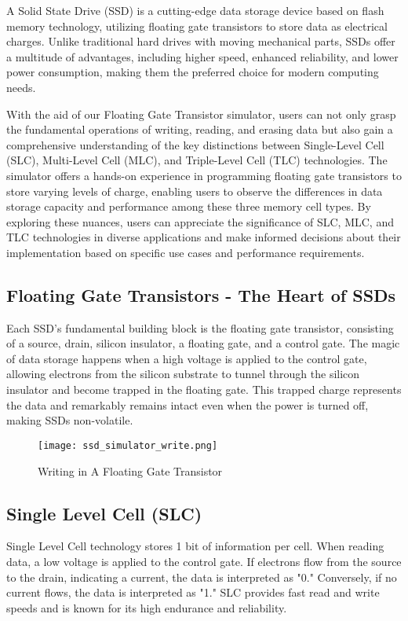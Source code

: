 \documentclass[conference]{/home/habib/Desktop/flash_ssd_simulator_web/paper_writing/latex_file/IEEEtran}
\begin{document}
A Solid State Drive (SSD) is a cutting-edge data storage device based on flash memory technology, utilizing floating gate transistors to store data as electrical charges. Unlike traditional hard drives with moving mechanical parts, SSDs offer a multitude of advantages, including higher speed, enhanced reliability, and lower power consumption, making them the preferred choice for modern computing needs.

With the aid of our Floating Gate Transistor simulator, users can not only grasp the fundamental operations of writing, reading, and erasing data but also gain a comprehensive understanding of the key distinctions between Single-Level Cell (SLC), Multi-Level Cell (MLC), and Triple-Level Cell (TLC) technologies. The simulator offers a hands-on experience in programming floating gate transistors to store varying levels of charge, enabling users to observe the differences in data storage capacity and performance among these three memory cell types. By exploring these nuances, users can appreciate the significance of SLC, MLC, and TLC technologies in diverse applications and make informed decisions about their implementation based on specific use cases and performance requirements.

\subsection{Floating Gate Transistors - The Heart of SSDs}
Each SSD's fundamental building block is the floating gate transistor, consisting of a source, drain, silicon insulator, a floating gate, and a control gate. The magic of data storage happens when a high voltage is applied to the control gate, allowing electrons from the silicon substrate to tunnel through the silicon insulator and become trapped in the floating gate. This trapped charge represents the data and remarkably remains intact even when the power is turned off, making SSDs non-volatile.
\begin{figure}[h]
    \centering
    \texttt{[image: ssd\_simulator\_write.png]}
    \caption{Writing in A Floating Gate Transistor}
    \label{fig:ssd_simulator_write}
\end{figure}
\subsection{Single Level Cell (SLC)}
Single Level Cell technology stores 1 bit of information per cell. When reading data, a low voltage is applied to the control gate. If electrons flow from the source to the drain, indicating a current, the data is interpreted as "0." Conversely, if no current flows, the data is interpreted as "1." SLC provides fast read and write speeds and is known for its high endurance and reliability.
\end{document}
